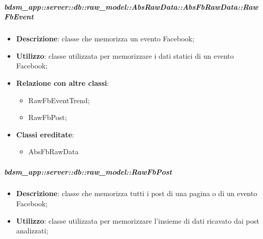 				\subparagraph{bdsm\_app::server::db::raw\_model::AbsRawData::AbsFbRawData::RawFbEvent} %
			\label{subp:bdsm_app_server_raw_model_AbsRawData_AbsFbRawData_RawFbEvent}
				\begin{itemize}
					\item \textbf{Descrizione}: classe che memorizza un evento Facebook;
					\item \textbf{Utilizzo}: classe utilizzata per memorizzare i dati statici di un evento Facebook;
					\item \textbf{Relazione con altre classi}:
					\begin{itemize}
						\item RawFbEventTrend;
						\item RawFbPost;
					\end{itemize}
					\item \textbf{Classi ereditate}:
					\begin{itemize}
						\item AbsFbRawData
					\end{itemize}
				\end{itemize}
				\subparagraph{bdsm\_app::server::db::raw\_model::RawFbPost} %
			\label{subp:bdsm_app_server_raw_model_RawFbPost}
				\begin{itemize}
					\item \textbf{Descrizione}: classe che memorizza tutti i post di una pagina o di un evento Facebook;
					\item \textbf{Utilizzo}: classe utilizzata per memorizzare l'insieme di dati ricavato dai post analizzati;
				\end{itemize}
				
				
				

